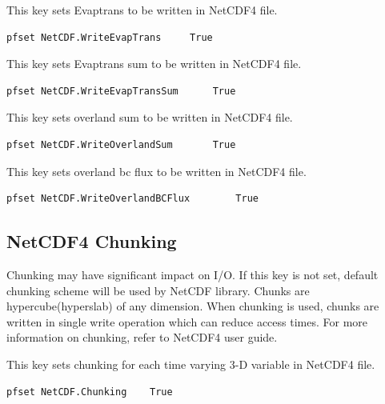 {This key sets Evaptrans to be written in NetCDF4 file.}
\begin{display}\begin{verbatim}
pfset NetCDF.WriteEvapTrans	    True
\end{verbatim}\end{display}

{This key sets Evaptrans sum to be written in NetCDF4 file.}
\begin{display}\begin{verbatim}
pfset NetCDF.WriteEvapTransSum	    True
\end{verbatim}\end{display}

{This key sets overland sum to be written in NetCDF4 file.}
\begin{display}\begin{verbatim}
pfset NetCDF.WriteOverlandSum	    True
\end{verbatim}\end{display}

{This key sets overland bc flux to be written in NetCDF4 file.}
\begin{display}\begin{verbatim}
pfset NetCDF.WriteOverlandBCFlux	    True
\end{verbatim}\end{display}

\subsection{NetCDF4 Chunking}
Chunking may have significant impact on I/O. If this key is not set, default chunking scheme will be used by NetCDF library. Chunks are hypercube(hyperslab) of any dimension. When chunking is used, chunks are written in single write operation which can reduce access times. For more information on chunking, refer to NetCDF4 user guide.

{This key sets chunking for each time varying 3-D variable in NetCDF4 file.}
\begin{display}\begin{verbatim}
pfset NetCDF.Chunking    True
\end{verbatim}\end{display}

